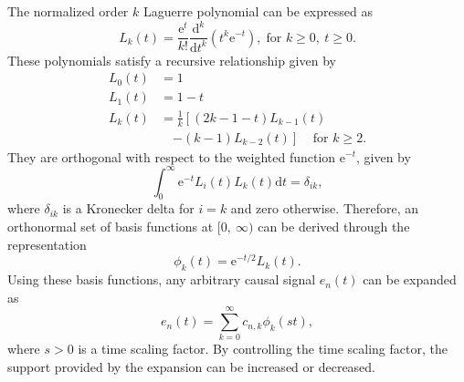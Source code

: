 \documentclass[conference, a4paper]{IEEEtran}
\begin{document}
The normalized order $k$ Laguerre polynomial can be expressed as
\begin{equation}
L_k(t)=\frac{\mathrm{e}^t}{k!}\frac{\mathrm{d}^k}{\mathrm{d}t^k}(t^k\mathrm{e}^{-t}),\;
\text{for $k\ge 0,\:t\ge 0$}.
\end{equation}
These polynomials satisfy a recursive relationship given by
\begin{equation}
\begin{split}
L_0(t)&=1 \\
L_1(t)&=1-t \\
L_k(t)&=\frac{1}{k}\left [ (2k-1-t)L_{k-1}(t)\right . \\
 &\quad \left . -(k-1)L_{k-2}(t)\right ]
\;\;\;\;\text{for $k\ge 2$.}
\end{split}
\end{equation}
They are orthogonal with respect to the weighted function
$\mathrm{e}^{-t}$, given by
\begin{equation}
\int _{0}^{\infty}\mathrm{e}^{-t}L_i(t)L_k(t)\mathrm{d}t=\delta _{ik},
\end{equation}
where $\delta _{ik}$ is a Kronecker delta for $i=k$ and zero otherwise.
Therefore, an orthonormal set of basis functions at $[0,\:\infty)$ can be derived through
the representation
\begin{equation}
\phi _k(t)=\mathrm{e}^{-t/2}L_k(t).
\end{equation}
Using these basis functions, any arbitrary causal signal $e_n(t)$ can be
expanded as
\begin{equation}
e_n(t)=\sum _{k=0}^{\infty}c_{n,k}\phi _k(st),
\end{equation}
where $s>0$ is a time scaling factor. By controlling the time scaling
factor, the support provided by the expansion can be increased or
decreased.
\end{document}
